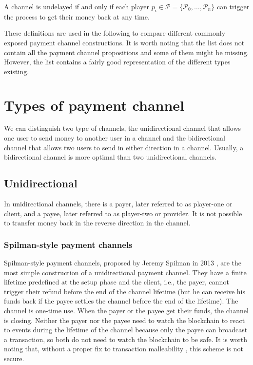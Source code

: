 \begin{definition}[Undelayed]
  A channel is undelayed if and only if each player $p_i \in \mathcal{P} = \{\mathcal{P}_0,
  \dots, \mathcal{P}_n\}$ can trigger the process to get their money back at any time.
\end{definition}

These definitions are used in the following to compare different commonly
exposed payment channel constructions. It is worth noting that the list does not
contain all the payment channel propositions and some of them might be missing.
However, the list contains a fairly good representation of the different types
existing.

\minitoc

\newpage

\section{Types of payment channel}

We can distinguish two type of channels, the unidirectional channel that allows
one user to send money to another user in a channel and the bidirectional
channel that allows two users to send in either direction in a channel. Usually, a
bidirectional channel is more optimal than two unidirectional channels.

\subsection{Unidirectional}

In unidirectional channels, there is a payer, later referred to as player-one or
client, and a payee, later referred to as player-two or provider.  It is not
possible to transfer money back in the reverse direction in the channel.

\subsubsection{Spilman-style payment channels}

Spilman-style payment channels, proposed by Jeremy Spilman in 2013
\cite{SpilmanStyle}, are the most simple construction of a unidirectional
payment channel. They have a finite lifetime predefined at the setup phase and
the client, i.e., the payer, cannot trigger their refund before the end of the
channel lifetime (but he can receive his funds back if the payee settles the
channel before the end of the lifetime). The channel is one-time use. When the
payer or the payee get their funds, the channel is closing. Neither the payer nor the
payee need to watch the blockchain to react to events during the lifetime of
the channel because only the payee can broadcast a transaction, so both do not
need to watch the blockchain to be safe. It is worth noting that, without a
proper fix to transaction malleability \cite{SegWitBIP, BIP62,
DBLP:journals/corr/AndrychowiczDMM13, DBLP:journals/corr/DeckerW14}, this scheme
is not secure.

